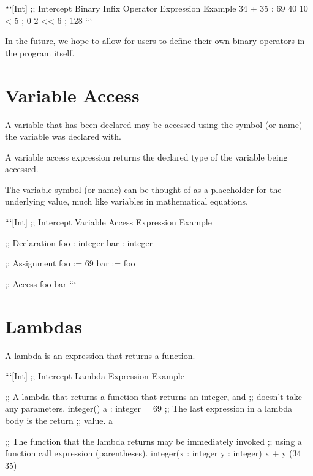 \documentclass[12pt]{report}
\begin{document}
```[Int]
;; Intercept Binary Infix Operator Expression Example
34 + 35  ; 69
40 %
10 < 5   ; 0
2 << 6   ; 128
```

In the future, we hope to allow for users to define their own binary operators in the program itself.


\section{Variable Access}
\label{sec:expressions-variable_access}

A variable that has been declared may be accessed using the symbol (or name) the variable was declared with.

A variable access expression returns the declared type of the variable being accessed.

The variable symbol (or name) can be thought of as a placeholder for the underlying value, much like variables in mathematical equations.

```[Int]
;; Intercept Variable Access Expression Example

;; Declaration
foo : integer
bar : integer

;; Assignment
foo := 69
bar := foo

;; Access
foo
bar
```

\section{Lambdas}
\label{subsec:expressions-lambdas}

A lambda is an expression that returns a function.

```[Int]
;; Intercept Lambda Expression Example

;; A lambda that returns a function that returns an integer, and
;; doesn't take any parameters.
integer() {
  a : integer = 69
  ;; The last expression in a lambda body is the return
  ;; value.
  a
}

;; The function that the lambda returns may be immediately invoked
;; using a function call expression (parentheses).
integer(x : integer  y : integer) {
  x + y
} (34 35)
\end{document}
